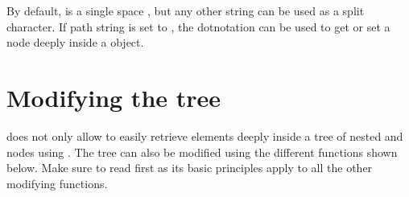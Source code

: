 \documentclass[a4paper,10pt,english]{sphinxmanual}
\begin{document}
\sphinxAtStartPar
By default,  is a single space , but any other string can be used as a split character. If path string is set to , the dot\sphinxhyphen{}notation can be used to get or set a node deeply inside a \sphinxhyphen{}object.

\begin{sphinxVerbatim}[commandchars=\\\{\},numbers=left,firstnumber=1,stepnumber=1]
  
    
   
    
  
    
\end{sphinxVerbatim}


\section{Modifying the tree}
\label{\detokenize{README:modifying-the-tree}}
\sphinxAtStartPar
{} does not only allow to easily retrieve elements deeply inside a tree of nested \sphinxhyphen{} and \sphinxhyphen{}nodes using {\hyperref[\detokenize{README:the-path-parameter}]{}}. The tree can also be modified using the different functions shown below. Make sure to read {\hyperref[\detokenize{README:set-adding-and-overwriting-elements}]{}} first as its basic principles apply to all the other modifying functions.
\end{document}
